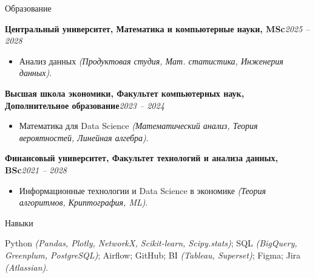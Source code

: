 \documentclass[]{mcdowellcv}
\renewenvironment{cvsubsection}[2]{%
  \begin{adjustwidth}{\subsectionmargin}{\subsectionmargin}%
    {\bfseries #1}\hfill #2\par\vspace{0.5em}%
}{%
  \end{adjustwidth}%
  \vspace*{\aftersubsectionspace}%
}
\begin{document}
    \begin{cvsection}{\Large Образование}
        \begin{cvsubsection}{Центральный университет, Математика и компьютерные науки, MSc}{\textit{2025 -- 2028}}
            \begin{itemize}
                \item Анализ данных \textit{(Продуктовая студия, Мат. статистика, Инженерия данных)}.
            \end{itemize}
        \end{cvsubsection}
        \begin{cvsubsection}{Высшая школа экономики, Факультет компьютерных наук, Дополнительное образование}{\textit{2023 -- 2024}}
            \begin{itemize}
                \item Математика для Data Science \textit{(Математический анализ, Теория вероятностей, Линейная алгебра)}.
            \end{itemize}
        \end{cvsubsection}
        \begin{cvsubsection}{Финансовый университет, Факультет технологий и анализа данных, BSc}{\textit{2021 -- 2028}}
            \begin{itemize}
                \item Информационные технологии и Data Science в экономике \textit{(Теория алгоритмов, Криптография, ML)}.
            \end{itemize}
        \end{cvsubsection}
    \end{cvsection}
    
    \begin{cvsection}{\Large Навыки}
	\vspace{-1.5em}
    \begin{cvsubsection}{}{}{}  
        Python \textit{(Pandas, Plotly, NetworkX, Scikit-learn, Scipy.stats)}; SQL \textit{(BigQuery, Greenplum, PostgreSQL)}; Airflow; GitHub; BI \textit{(Tableau, Superset)}; Figma; Jira \textit{(Atlassian)}.
    \end{cvsubsection}
	\end{cvsection}
    
\end{document}
